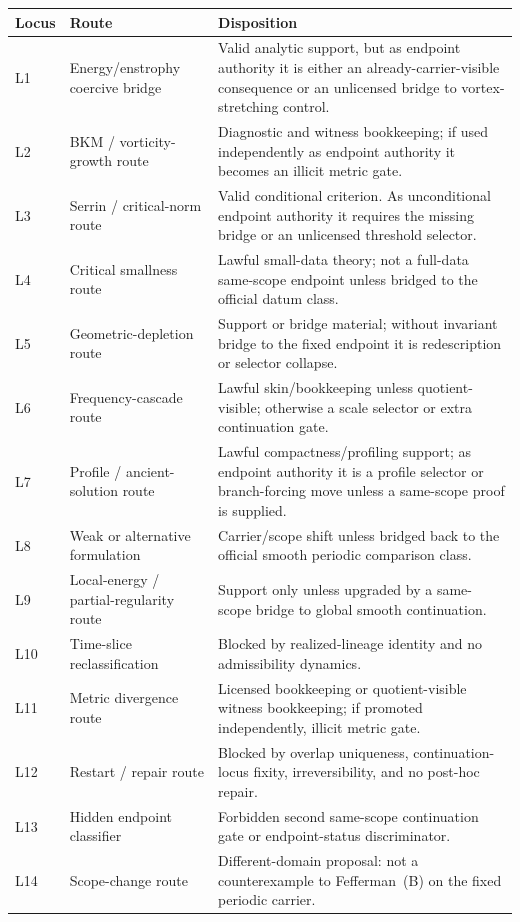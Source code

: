 \begin{center}
\scriptsize
\renewcommand{\arraystretch}{1.12}
\setlength{\tabcolsep}{3pt}
\begin{tabularx}{0.98\textwidth}{@{}L{0.11\textwidth}L{0.24\textwidth}Y@{}}
\toprule
\textbf{Locus} & \textbf{Route} & \textbf{Disposition}\\
\midrule
L1 & Energy/enstrophy coercive bridge & Valid analytic support, but as endpoint authority it is either an already-carrier-visible consequence or an unlicensed bridge to vortex-stretching control.\\
L2 & BKM / vorticity-growth route & Diagnostic and witness bookkeeping; if used independently as endpoint authority it becomes an illicit metric gate.\\
L3 & Serrin / critical-norm route & Valid conditional criterion. As unconditional endpoint authority it requires the missing bridge or an unlicensed threshold selector.\\
L4 & Critical smallness route & Lawful small-data theory; not a full-data same-scope endpoint unless bridged to the official datum class.\\
L5 & Geometric-depletion route & Support or bridge material; without invariant bridge to the fixed endpoint it is redescription or selector collapse.\\
L6 & Frequency-cascade route & Lawful skin/bookkeeping unless quotient-visible; otherwise a scale selector or extra continuation gate.\\
L7 & Profile / ancient-solution route & Lawful compactness/profiling support; as endpoint authority it is a profile selector or branch-forcing move unless a same-scope proof is supplied.\\
L8 & Weak or alternative formulation & Carrier/scope shift unless bridged back to the official smooth periodic comparison class.\\
L9 & Local-energy / partial-regularity route & Support only unless upgraded by a same-scope bridge to global smooth continuation.\\
L10 & Time-slice reclassification & Blocked by realized-lineage identity and no admissibility dynamics.\\
L11 & Metric divergence route & Licensed bookkeeping or quotient-visible witness bookkeeping; if promoted independently, illicit metric gate.\\
L12 & Restart / repair route & Blocked by overlap uniqueness, continuation-locus fixity, irreversibility, and no post-hoc repair.\\
L13 & Hidden endpoint classifier & Forbidden second same-scope continuation gate or endpoint-status discriminator.\\
L14 & Scope-change route & Different-domain proposal: not a counterexample to Fefferman~(B) on the fixed periodic carrier.\\
\bottomrule
\end{tabularx}
\end{center}

